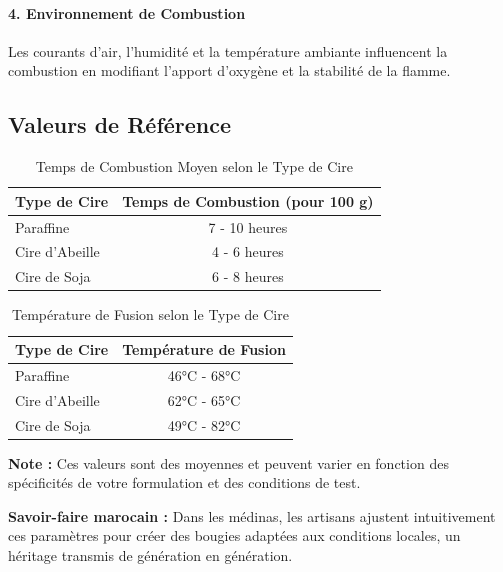 \documentclass[11pt,fleqn,onecolumn,oneside]{book}
\begin{document}
\paragraph{4. Environnement de Combustion}
Les courants d'air, l'humidité et la température ambiante influencent la combustion en modifiant l’apport d’oxygène et la stabilité de la flamme.


\subsection*{Valeurs de Référence}

\begin{table}[H]
    \centering
    \caption{Temps de Combustion Moyen selon le Type de Cire}
    \label{tab:temps_combustion}
    \begin{tabular}{|l|c|}
        \hline
        \textbf{Type de Cire} & \textbf{Temps de Combustion (pour 100 g)} \\
        \hline
        Paraffine & 7 - 10 heures \\
        Cire d'Abeille & 4 - 6 heures \\
        Cire de Soja & 6 - 8 heures \\
        \hline
    \end{tabular}
\end{table}

\begin{table}[H]
    \centering
    \caption{Température de Fusion selon le Type de Cire}
    \label{tab:temperature_fusion}
    \begin{tabular}{|l|c|}
        \hline
        \textbf{Type de Cire} & \textbf{Température de Fusion} \\
        \hline
        Paraffine & 46°C - 68°C \\
        Cire d'Abeille & 62°C - 65°C \\
        Cire de Soja & 49°C - 82°C \\
        \hline
    \end{tabular}
\end{table}

\begin{remark}
\textbf{Note :} Ces valeurs sont des moyennes et peuvent varier en fonction des spécificités de votre formulation et des conditions de test.
\end{remark}

\begin{remark}
\textbf{Savoir-faire marocain :} Dans les médinas, les artisans ajustent intuitivement ces paramètres pour créer des bougies adaptées aux conditions locales, un héritage transmis de génération en génération.
\end{remark}
\end{document}
